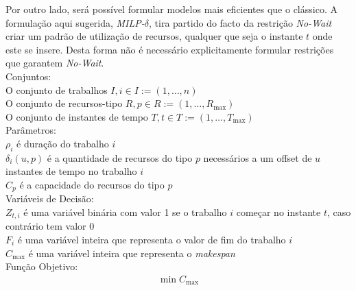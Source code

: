 Por outro lado, será possível formular modelos mais eficientes que o clássico. A formulação aqui sugerida, \textit{MILP-$\delta$}, tira partido do facto da restrição \textit{No-Wait} criar um padrão de utilização de recursos, qualquer que seja o instante $t$ onde este se insere. Desta forma não é necessário explicitamente formular restrições que garantem \textit{No-Wait}.\\

Conjuntos:\\
O conjunto de trabalhos $I, i \in I := (1, \ldots, n)$ \\
O conjunto de recursos-tipo $R, p \in R := (1, \ldots, R_{\max})$ \\
O conjunto de instantes de tempo $T, t \in T := (1, \ldots, T_{\max})$ \\

Parâmetros:\\
$\rho_{i}$ é duração do trabalho $i$ \\
$\delta_{i}(u,p)$ é a quantidade de recursos do tipo $p$ necessários a um offset de $u$ instantes de tempo no trabalho $i$\\
$C_{p}$ é a capacidade do recursos do tipo $p$ \\

Variáveis de Decisão: \\
$Z_{t,i}$ é uma variável binária com valor 1 se o trabalho $i$ começar no instante $t$, caso contrário tem valor 0 \\
$F_{i}$ é uma variável inteira que representa o valor de fim do trabalho $i$ \\
$C_{\max}$ é uma variável inteira que representa o \textit{makespan} \\

Função Objetivo:
\begin{align}
\min C_{\max} \label{eq:10}
\end{align}


